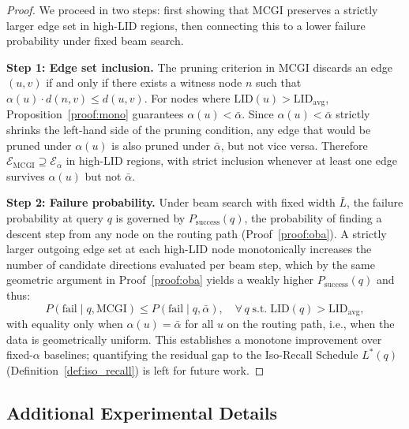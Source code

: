 \documentclass{article}
\theoremstyle{plain}
\theoremstyle{definition}
\theoremstyle{remark}
\newcommand{\ours}{MCGI\xspace}
\begin{document}
\begin{proof}
We proceed in two steps: first showing that MCGI preserves a strictly larger edge set in high-LID regions, then connecting this to a lower failure probability under fixed beam search.

\textbf{Step 1: Edge set inclusion.} The pruning criterion in \ours{} discards an edge $(u, v)$ if and only if there exists a witness node $n$ such that $\alpha(u) \cdot d(n, v) \leq d(u, v)$. For nodes where $\mathrm{LID}(u) > \mathrm{LID}_{\mathrm{avg}}$, Proposition~\ref{proof:mono} guarantees $\alpha(u) < \bar{\alpha}$. Since $\alpha(u) < \bar{\alpha}$ strictly shrinks the left-hand side of the pruning condition, any edge that would be pruned under $\alpha(u)$ is also pruned under $\bar{\alpha}$, but not vice versa. Therefore $\mathcal{E}_{\mathrm{MCGI}} \supseteq \mathcal{E}_{\bar{\alpha}}$ in high-LID regions, with strict inclusion whenever at least one edge survives $\alpha(u)$ but not $\bar{\alpha}$.

\textbf{Step 2: Failure probability.} Under beam search with fixed width $\bar{L}$, the failure probability at query $q$ is governed by $P_{\mathrm{success}}(q)$, the probability of finding a descent step from any node on the routing path (Proof~\ref{proof:oba}). A strictly larger outgoing edge set at each high-LID node monotonically increases the number of candidate directions evaluated per beam step, which by the same geometric argument in Proof~\ref{proof:oba} yields a weakly higher $P_{\mathrm{success}}(q)$ and thus:
\begin{equation}
    P(\mathrm{fail} \mid q, \mathrm{MCGI}) \leq P(\mathrm{fail} \mid q, \bar{\alpha}), \quad \forall\, q \;\text{s.t.}\; \mathrm{LID}(q) > \mathrm{LID}_{\mathrm{avg}},
\end{equation}
with equality only when $\alpha(u) = \bar{\alpha}$ for all $u$ on the routing path, i.e., when the data is geometrically uniform. This establishes a monotone improvement over fixed-$\alpha$ baselines; quantifying the residual gap to the Iso-Recall Schedule $L^*(q)$ (Definition~\ref{def:iso_recall}) is left for future work.
\end{proof}

\subsection{Additional Experimental Details}
\label{appendix:setup}
\end{document}
